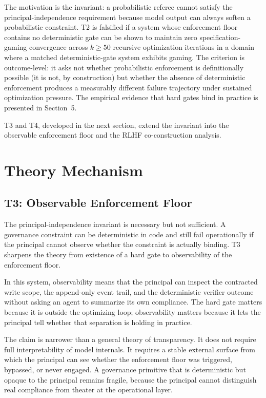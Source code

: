 \documentclass[11pt]{article}
\begin{document}
The motivation is the invariant: a probabilistic referee cannot satisfy the principal-independence requirement because model output can always soften a probabilistic constraint. T2 is falsified if a system whose enforcement floor contains no deterministic gate can be shown to maintain zero specification-gaming convergence across $k \geq 50$ recursive optimization iterations in a domain where a matched deterministic-gate system exhibits gaming. The criterion is outcome-level: it asks not whether probabilistic enforcement is definitionally possible (it is not, by construction) but whether the absence of deterministic enforcement produces a measurably different failure trajectory under sustained optimization pressure. The empirical evidence that hard gates bind in practice is presented in Section~5.

T3 and T4, developed in the next section, extend the invariant into the observable enforcement floor and the RLHF co-construction analysis.


\section{Theory Mechanism}

\subsection{T3: Observable Enforcement Floor}

The principal-independence invariant is necessary but not sufficient. A governance constraint can be deterministic in code and still fail operationally if the principal cannot observe whether the constraint is actually binding. T3 sharpens the theory from existence of a hard gate to observability of the enforcement floor.

In this system, observability means that the principal can inspect the contracted write scope, the append-only event trail, and the deterministic verifier outcome without asking an agent to summarize its own compliance. The hard gate matters because it is outside the optimizing loop; observability matters because it lets the principal tell whether that separation is holding in practice.

The claim is narrower than a general theory of transparency. It does not require full interpretability of model internals. It requires a stable external surface from which the principal can see whether the enforcement floor was triggered, bypassed, or never engaged. A governance primitive that is deterministic but opaque to the principal remains fragile, because the principal cannot distinguish real compliance from theater at the operational layer.
\end{document}
